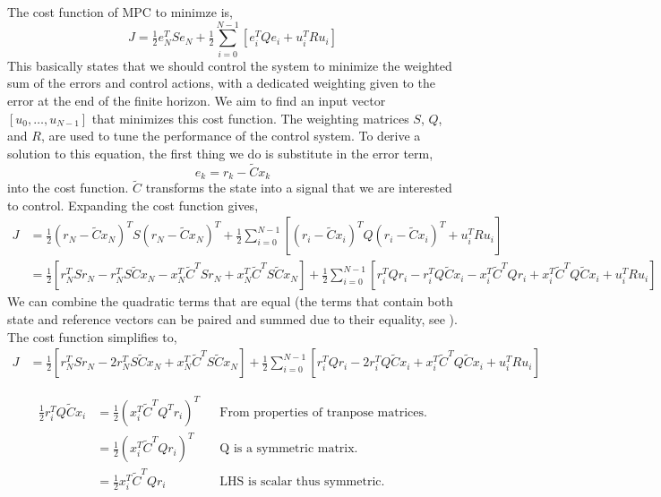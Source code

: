\documentclass{article}
\begin{document}
The cost function of MPC to minimze is,
\begin{equation}
    J = \tfrac{1}{2}e_N^TSe_N + \tfrac{1}{2}\sum_{i=0}^{N-1}\left[ e_i^TQe_i + u_i^TRu_i \right]
\end{equation}
This basically states that we should control the system to minimize the weighted sum of the errors and control
actions, with a dedicated weighting given to the error at the end of the finite horizon. We aim to find an input vector
$[u_0, \ldots, u_{N-1}]$ that minimizes this cost function. The weighting matrices $S$, $Q$, and $R$, are used to tune
the performance of the control system. To derive a solution to this equation, the first thing we do is substitute in
the error term,
\begin{equation}
    e_k = r_k - \tilde{C}x_k
\end{equation}
into the cost function. $\tilde{C}$ transforms the state into a signal that we are interested to control. Expanding the
cost function gives,
\begin{align}
    J
    &= \tfrac{1}{2}\left(r_N - \tilde{C}x_N\right)^TS\left(r_N - \tilde{C}x_N\right)^T
        + \tfrac{1}{2}\sum_{i=0}^{N-1}\left[
            \left(r_i - \tilde{C}x_i\right)^TQ\left(r_i - \tilde{C}x_i\right)^T + u_i^TRu_i
        \right] \\
    &= \tfrac{1}{2}\left[r_N^TSr_N - r_N^TS\tilde{C}x_N - x_N^T\tilde{C}^TSr_N + x_N^T\tilde{C}^TS\tilde{C}x_N\right]
       + \tfrac{1}{2}\sum_{i=0}^{N-1}\left[
            r_i^TQr_i - r_i^TQ\tilde{C}x_i - x_i^T\tilde{C}^TQr_i + x_i^T\tilde{C}^TQ\tilde{C}x_i
            + u_i^TRu_i
        \right]
\end{align}
We can combine the quadratic terms that are equal (the terms that contain both state and reference vectors can be
paired and summed due to their equality, see ). The cost function simplifies to,
\begin{align}
    J
    &= \tfrac{1}{2}\left[r_N^TSr_N - 2r_N^TS\tilde{C}x_N + x_N^T\tilde{C}^TS\tilde{C}x_N\right]
        + \tfrac{1}{2}\sum_{i=0}^{N-1}\left[
        r_i^TQr_i - 2r_i^TQ\tilde{C}x_i + x_i^T\tilde{C}^TQ\tilde{C}x_i
        + u_i^TRu_i
    \right]
\end{align}

\begin{tcolorbox}[title={Cost Function Terms with $r_i$ and $x_i$ are Equal.}]
    \begin{align}
        \frac{1}{2}r_i^TQ\tilde{C}x_i
        &= \frac{1}{2}\left(x_i^T\tilde{C}^TQ^Tr_i\right)^T
            & & \text{From properties of tranpose matrices.} \label{eq:quad-a} \\
        &= \frac{1}{2}\left(x_i^T\tilde{C}^TQr_i\right)^T
            & & \text{Q is a symmetric matrix.} \label{eq:quad-b} \\
        &= \frac{1}{2}x_i^T\tilde{C}^TQr_i
           & & \text{LHS is scalar thus symmetric.}  \label{eq:quad-c}
    \end{align}
\end{tcolorbox}
\end{document}

